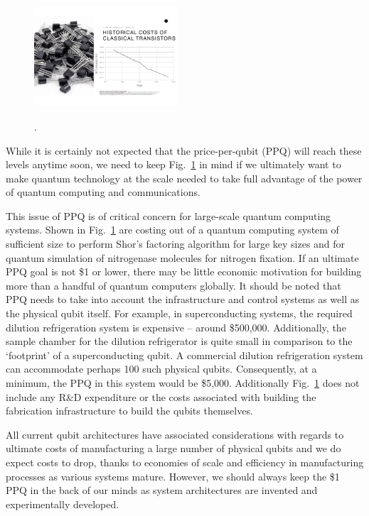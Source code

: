 \documentclass[twocolumn, aps, rmp, amsmath, amssymb, nofootinbib, superscriptaddress, longbibliography, floatfix, table-of-contents, eqsecnum]{revtex4-2}
\begin{document}
\begin{figure}[htbp!]
	\includegraphics[clip=true, width=0.475\textwidth]{cost}
	\caption{} \label{fig:price}.
\end{figure}

While it is certainly not expected that the price-per-qubit (PPQ) will reach these levels anytime soon, we need to keep Fig.~\ref{fig:price} in mind if we ultimately want to make quantum technology at the scale needed to take full advantage of the power of quantum computing and communications. 

This issue of PPQ is of critical concern for large-scale quantum computing systems. Shown in Fig.~\ref{fig:price} are costing out of a quantum computing system of sufficient size to perform Shor's factoring algorithm for large key sizes and for quantum simulation of nitrogenase molecules for nitrogen fixation. If an ultimate PPQ goal is not \$1 or lower, there may be little economic motivation for building more than a handful of quantum computers globally. It should be noted that PPQ needs to take into account the infrastructure and control systems as well as the physical qubit itself. For example, in superconducting systems, the required dilution refrigeration system is expensive -- around \$500,000. Additionally, the sample chamber for the dilution refrigerator is quite small in comparison to the `footprint' of a superconducting qubit. A commercial dilution refrigeration system can accommodate perhaps 100 such physical qubits. Consequently, at a minimum, the PPQ in this system would be \$5,000. Additionally Fig.~\ref{fig:price} does not include any R\&D expenditure or the costs associated with building the fabrication infrastructure to build the qubits themselves. 

All current qubit architectures have associated considerations with regards to ultimate costs of manufacturing a large number of physical qubits and we do expect costs to drop, thanks to economies of scale and efficiency in manufacturing processes as various systems mature. However, we should always keep the \$1 PPQ in the back of our minds as system architectures are invented and experimentally developed. 
\end{document}
